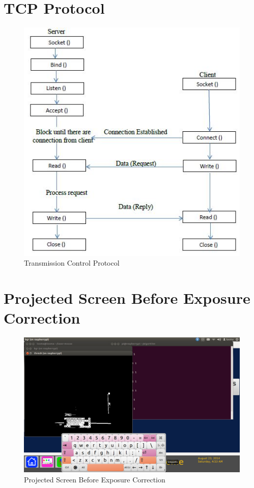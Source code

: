 \documentclass[12pt, a4paper]{article}
\begin{document}
\section{TCP Protocol}
\begin{figure}[htp]
\centering
\includegraphics[scale=1.00]{tcp.png}
\caption{Transmission Control Protocol}
\label{}
\end{figure}

\newpage
\section{Projected Screen Before Exposure Correction}
\begin{figure}[htp]
\includegraphics[scale=0.30]{projector.png}
\caption{Projected Screen Before Exposure Correction}
\label{}
\end{figure}
\newpage
\end{document}
